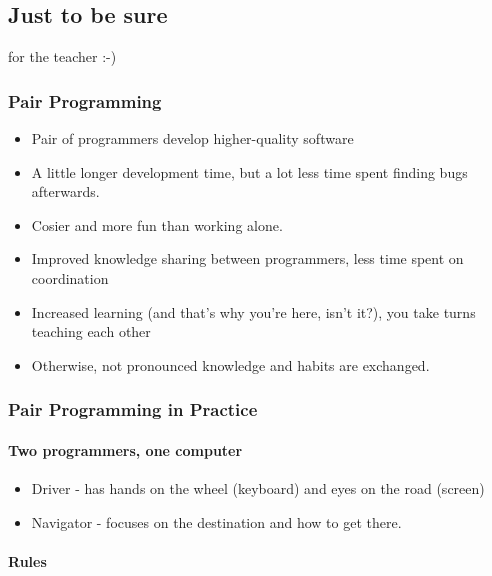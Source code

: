 \documentclass[
]{article}
\author{}
\date{}
\begin{document}
\hypertarget{just-to-be-sure}{%
\subsection{Just to be sure}\label{just-to-be-sure}}

for the teacher :-)

\hypertarget{pair-programming}{%
\subsubsection{Pair Programming}\label{pair-programming}}

\begin{itemize}
\item
  Pair of programmers develop higher-quality software
\item
  A little longer development time, but a lot less time spent finding
  bugs afterwards.
\item
  Cosier and more fun than working alone.
\item
  Improved knowledge sharing between programmers, less time spent on
  coordination
\item
  Increased learning (and that's why you're here, isn't it?), you take
  turns teaching each other
\item
  Otherwise, not pronounced knowledge and habits are exchanged.
\end{itemize}

\hypertarget{pair-programming-in-practice}{%
\subsubsection{Pair Programming in
Practice}\label{pair-programming-in-practice}}

\hypertarget{two-programmers-one-computer}{%
\paragraph{Two programmers, one
computer}\label{two-programmers-one-computer}}

\begin{itemize}
\item
  Driver - has hands on the wheel (keyboard) and eyes on the road
  (screen)
\item
  Navigator - focuses on the destination and how to get there.
\end{itemize}

\hypertarget{rules}{%
\paragraph{Rules}\label{rules}}
\end{document}

